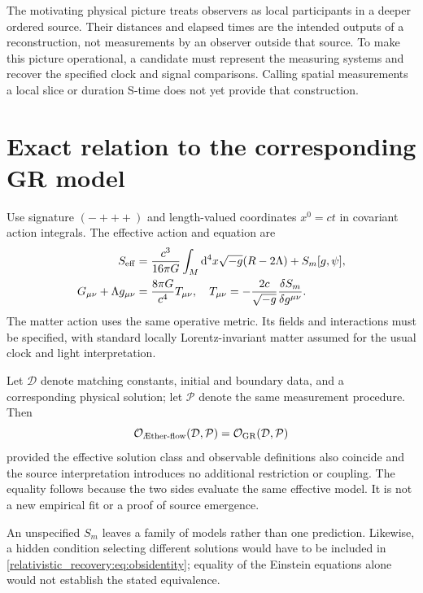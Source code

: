 \documentclass[11pt,oneside]{report}
\newcommand{\Aflow}{\AE{}ther-flow}
\newcommand{\dd}{\mathrm d}
\theoremstyle{remark}
\numberwithin{definition}{chapter}
\numberwithin{proposition}{chapter}
\numberwithin{remark}{chapter}
\begin{document}
The motivating physical picture treats observers as local participants in a deeper ordered source. Their distances and elapsed times are the intended outputs of a reconstruction, not measurements by an observer outside that source. To make this picture operational, a candidate must represent the measuring systems and recover the specified clock and signal comparisons. Calling spatial measurements a local slice or duration S-time does not yet provide that construction.

\section{Exact relation to the corresponding GR model}
Use signature $(-+++)$ and length-valued coordinates $x^0=ct$ in covariant action integrals. The effective action and equation are
\begin{align}
S_{\rm eff}&=\frac{c^3}{16\pi G}\int_M\dd^4x\sqrt{-g}(R-2\Lambda)+S_m[g,\psi],
\label{relativistic_recovery:eq:SA}\\
G_{\mu\nu}+\Lambda g_{\mu\nu}&=\frac{8\pi G}{c^4}T_{\mu\nu},
\quad T_{\mu\nu}=-\frac{2c}{\sqrt{-g}}\frac{\delta S_m}{\delta g^{\mu\nu}}.
\label{relativistic_recovery:eq:einstein}
\end{align}
The matter action uses the same operative metric. Its fields and interactions must be specified, with standard locally Lorentz-invariant matter assumed for the usual clock and light interpretation.

Let $\mathcal D$ denote matching constants, initial and boundary data, and a corresponding physical solution; let $\mathcal P$ denote the same measurement procedure. Then
\begin{equation}
\mathcal O_{\text{\Aflow}}(\mathcal D,\mathcal P)
=\mathcal O_{\rm GR}(\mathcal D,\mathcal P)
\label{relativistic_recovery:eq:obsidentity}
\end{equation}
provided the effective solution class and observable definitions also coincide and the source interpretation introduces no additional restriction or coupling. The equality follows because the two sides evaluate the same effective model. It is not a new empirical fit or a proof of source emergence.

An unspecified $S_m$ leaves a family of models rather than one prediction. Likewise, a hidden condition selecting different solutions would have to be included in \eqref{relativistic_recovery:eq:obsidentity}; equality of the Einstein equations alone would not establish the stated equivalence.
\end{document}
